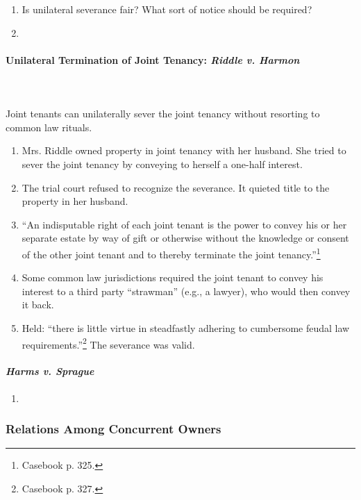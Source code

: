 \begin{enumerate}
    \item Is unilateral severance fair? What sort of notice should be 
    required?
    \item %
\end{enumerate}

\paragraph{Unilateral Termination of Joint Tenancy: \emph{Riddle v. Harmon}}
~\\\\
Joint tenants can unilaterally sever the joint tenancy without resorting to 
common law rituals.

\begin{enumerate}
    \item Mrs. Riddle owned property in joint tenancy with her husband. She 
    tried to sever the joint tenancy by conveying to herself a one-half 
    interest.
    \item The trial court refused to recognize the severance. It quieted title 
    to the property in her husband.
    \item ``An indisputable right of each joint tenant is the power to convey 
    his or her separate estate by way of gift or otherwise without the 
    knowledge or consent of the other joint tenant and to thereby terminate 
    the joint tenancy.''\footnote{Casebook p. 325.}
    \item Some common law jurisdictions required the joint tenant to convey 
    his interest to a third party ``strawman'' (e.g., a lawyer), who would 
    then convey it back.
    \item Held: ``there is little virtue in steadfastly adhering to cumbersome 
    feudal law requirements.''\footnote{Casebook p. 327.} The severance was 
    valid.
\end{enumerate}

\paragraph{\emph{Harms v. Sprague}}

\begin{enumerate}
    \item %
\end{enumerate}

\subsubsection{Relations Among Concurrent Owners}

